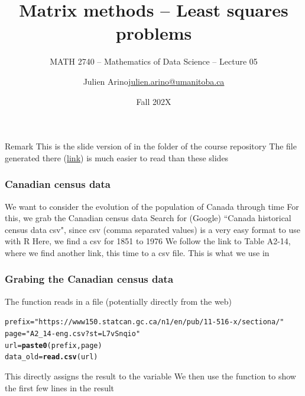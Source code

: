 \documentclass[aspectratio=169]{beamer}\usepackage[]{graphicx}\usepackage[]{xcolor}
\subtitle{MATH 2740 -- Mathematics of Data Science -- Lecture 05}
\author{\texorpdfstring{Julien Arino\newline\url{julien.arino@umanitoba.ca}}{Julien Arino}}
\institute{Department of Mathematics @ University of Manitoba}
\date{Fall 202X}
\title{Matrix methods -- Least squares problems}
\makeatletter
\newcommand{\hlsng}[1]{\textcolor[rgb]{0.192,0.494,0.8}{#1}}%
\newcommand{\hldef}[1]{\textcolor[rgb]{0.345,0.345,0.345}{#1}}%
\newcommand{\hlkwb}[1]{\textcolor[rgb]{0.69,0.353,0.396}{#1}}%
\newcommand{\hlkwd}[1]{\textcolor[rgb]{0.737,0.353,0.396}{\textbf{#1}}}%
\newenvironment{kframe}{%
 \def\at@end@of@kframe{}%
 \ifinner\ifhmode%
  \def\at@end@of@kframe{\end{minipage}}%
  \begin{minipage}{\columnwidth}%
 \fi\fi%
 \def\FrameCommand##1{\hskip\@totalleftmargin \hskip-\fboxsep
 \colorbox{shadecolor}{##1}\hskip-\fboxsep
     \hskip-\linewidth \hskip-\@totalleftmargin \hskip\columnwidth}%
 \MakeFramed {\advance\hsize-\width
   \@totalleftmargin\z@ \linewidth\hsize
   \@setminipage}}%
 {\par\unskip\endMakeFramed%
 \at@end@of@kframe}
\newenvironment{knitrout}{}{} %
\makeatother
\begin{document}





\begin{frame}{Remark}
This is the slide version of  in the folder  of the course repository
\vfill
The  file generated there (\href{https://julien-arino.github.io/math-of-data-science/CODE/Canada-census-get-plot-data.html}{link}) is much easier to read than these slides
\end{frame}

\begin{frame}\frametitle{Canadian census data}
We want to consider the evolution of the population of Canada through time
\vfill
For this, we grab the Canadian census data
\vfill Search for (Google) ``Canada historical census data csv", since csv (comma separated values) is a very easy format to use with R
\vfill
Here, we find a csv for 1851 to 1976
\vfill
We follow the link to Table A2-14, where we find another link, this time to a csv file. This is what we use in 
\end{frame}


\begin{frame}[fragile]
\frametitle{Grabing the Canadian census data}
The function  reads in a file (potentially directly from the web)
\vfill
\begin{knitrout}
\color{fgcolor}\begin{kframe}
\begin{alltt}
\hldef{prefix} \hlkwb{=} \hlsng{"https://www150.statcan.gc.ca/n1/en/pub/11-516-x/sectiona/"}
\hldef{page} \hlkwb{=} \hlsng{"A2_14-eng.csv?st=L7vSnqio"}
\hldef{url} \hlkwb{=} \hlkwd{paste0}\hldef{(prefix, page)}
\hldef{data_old} \hlkwb{=} \hlkwd{read.csv}\hldef{(url)}
\end{alltt}
\end{kframe}
\end{knitrout}
\vfill
This directly assigns the result to the variable 
\vfill
We then use the function  to show the first few lines in the result
\end{frame}
\end{document}
